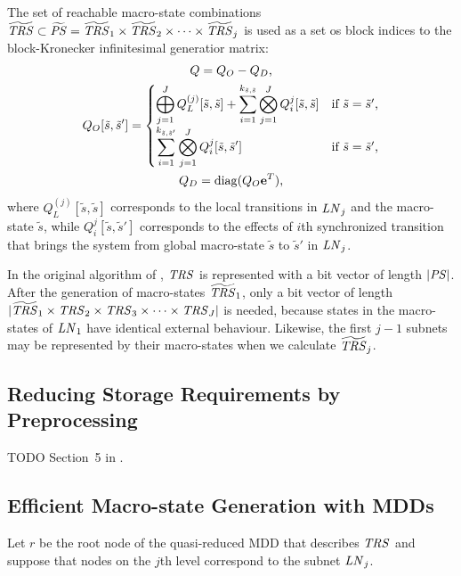 \documentclass[a4paper,10pt,twoside,openright]{memoir}
\newcommand*{\LN}{\textnormal{\emph{LN}}}
\renewcommand*{\vec}[1]{\boldsymbol{\mathrm{#1}}}
\newcommand*{\TRS}{\textnormal{\emph{TRS}}}
\newcommand*{\PS}{\textnormal{\emph{PS}}}
\newcommand*{\macroS}{}\let\macroS\tilde
\newcommand*{\macroStates}{}\let\macroStates\widetilde
\newcommand*{\macroTRS}{\macroStates{\TRS}}
\DeclareMathOperator{\diag}{diag}
\begin{document}
The set of reachable macro-state combinations
$\macroTRS \subset \macroStates{\PS} = \macroTRS_1 \times \macroTRS_2
\times \cdots \times \macroTRS_j$
is used as a set os block indices to the block-Kronecker infinitesimal
generatior matrix:
\begin{gather}
  Q = Q_O - Q_D \text, \\
  Q_O[\macroS{s}, \macroS{s}'] = \begin{cases} \displaystyle
    \bigoplus_{j = 1}^J Q_L^{(j)}[\macroS{s}, \macroS{s}] + \sum_{i =
      1}^{k_{\macroS{s}, \macroS{s}}} \bigotimes_{j = 1}^J
    Q_{i}^{j}[\macroS{s},
    \macroS{s}] & \text{if $\macroS{s} = \macroS{s}'$,} \\
    \displaystyle \sum_{i = 1}^{k_{\macroS{s}, \macroS{s}'}}
    \bigotimes_{j = 1}^J Q_{i}^{j}[\macroS{s}, \macroS{s}'] & \text{if
      $\macroS{s} = \macroS{s}'$,}
  \end{cases} \\
  Q_D = \diag (Q_O \vec{e}^T) \text,
\end{gather}
where $Q_L^{(j)}[\macroS{s}, \macroS{s}]$ corresponds to the local
transitions in $\LN_j$ and the macro-state $\macroS{s}$, while
$Q_{i}^{j}[\macroS{s}, \macroS{s}']$ corresponds to the effects of
$i$th synchronized transition that brings the system from global
macro-state $\macroS{s}$ to $\macroS{s}'$ in $\LN_j$.

In the original algorithm of \citet{DBLP:journals/tse/Buchholz99},
$\TRS$ is represented with a bit vector of length $\lvert \PS
\rvert$.
After the generation of macro-states $\macroTRS_1$, only a bit vector
of length
$\lvert \macroTRS_1 \times \TRS_2 \times \TRS_3 \times \cdots \times
\TRS_J \rvert$
is needed, because states in the macro-states of $\LN_1$ have
identical external behaviour. Likewise, the first $j - 1$ subnets may
be represented by their macro-states when we calculate $\macroTRS_j$.

\subsection{Reducing Storage Requirements by Preprocessing}

TODO Section~5 in \citet{DBLP:journals/tse/Buchholz99}.

\subsection{Efficient Macro-state Generation with MDDs}

Let $r$ be the root node of the quasi-reduced MDD that describes
$\TRS$ and suppose that nodes on the $j$th level correspond to the
subnet $\LN_j$.
\end{document}
